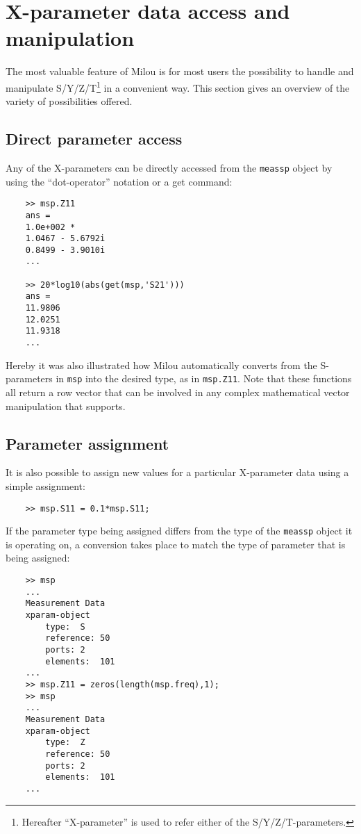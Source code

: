%
\section{X-parameter data access and manipulation}\label{sec:SPMod}
The most valuable feature of Milou is for most users the
possibility to handle and manipulate S/Y/Z/T\footnote{Hereafter
``X-parameter'' is used to refer either of the
S/Y/Z/T-parameters.} in a convenient way. This section gives an
overview of the variety of possibilities offered.

\subsection{Direct parameter access}
Any of the X-parameters can be directly accessed from the
\verb"meassp" object by using the ``dot-operator'' notation or a
get command:

\begin{small}
\begin{verbatim}
    >> msp.Z11
    ans =
    1.0e+002 *
    1.0467 - 5.6792i
    0.8499 - 3.9010i
    ...

    >> 20*log10(abs(get(msp,'S21')))
    ans =
    11.9806
    12.0251
    11.9318
    ...
\end{verbatim}
\end{small}

Hereby it was also illustrated how Milou automatically converts
from the S-para\-meters in \verb"msp" into the desired type, as in
\verb"msp.Z11". Note that these functions all return a row vector
that can be involved in any complex mathematical vector
manipulation that \matlab supports.

\subsection{Parameter assignment}
It is also possible to assign new values for a particular
X-parameter data using a simple assignment:
\begin{small}
\begin{verbatim}
    >> msp.S11 = 0.1*msp.S11;
\end{verbatim}
\end{small}
If the parameter type being assigned differs from the type of the
\verb"meassp" object it is operating on, a conversion takes place
to match the type of parameter that is being assigned:
\begin{small}
\begin{verbatim}
    >> msp
    ...
    Measurement Data
    xparam-object
        type:  S
        reference: 50
        ports: 2
        elements:  101
    ...
    >> msp.Z11 = zeros(length(msp.freq),1);
    >> msp
    ...
    Measurement Data
    xparam-object
        type:  Z
        reference: 50
        ports: 2
        elements:  101
    ...
\end{verbatim}
\end{small}

